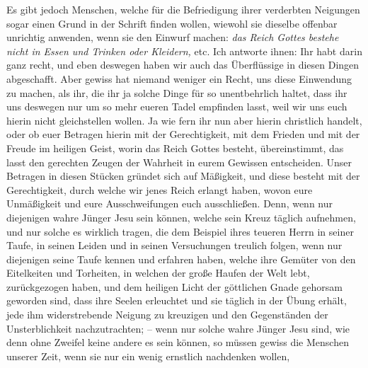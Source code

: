  Es gibt jedoch Menschen, welche für die
Befriedigung ihrer verderbten Neigungen
sogar einen Grund in der Schrift finden wollen, wiewohl sie dieselbe offenbar
unrichtig anwenden, wenn sie den Einwurf machen:
\textit{das Reich Gottes bestehe nicht
in Essen und Trinken oder Kleidern,} etc. Ich antworte ihnen: Ihr habt darin
ganz
recht, und eben deswegen haben wir auch das Überflüssige in diesen Dingen
abgeschafft. Aber gewiss hat niemand weniger ein Recht, uns diese Einwendung zu
machen, als ihr, die ihr ja solche Dinge für so unentbehrlich haltet, dass ihr
uns deswegen nur um so mehr eueren Tadel empfinden lasst, weil wir uns euch
hierin nicht gleichstellen wollen. Ja wie fern ihr nun aber hierin christlich
handelt, oder ob euer Betragen hierin mit der Gerechtigkeit, mit dem Frieden und
mit der Freude im heiligen Geist, worin das
Reich Gottes besteht,
übereinstimmt, das lasst den gerechten Zeugen der Wahrheit in
eurem Gewissen
entscheiden. Unser Betragen in diesen Stücken gründet sich auf Mäßigkeit, und
diese besteht mit der Gerechtigkeit, durch welche wir jenes Reich
erlangt
haben, wovon eure Unmäßigkeit und eure Ausschweifungen euch ausschließen. Denn,
wenn nur diejenigen wahre Jünger Jesu sein können, welche sein
Kreuz täglich
aufnehmen, und nur solche es wirklich tragen, die dem Beispiel ihres teueren
Herrn in seiner Taufe, in seinen Leiden und in seinen Versuchungen
treulich
folgen, wenn nur diejenigen seine Taufe kennen und erfahren haben, welche ihre
Gemüter von den Eitelkeiten und Torheiten, in welchen der große Haufen der Welt
lebt, zurückgezogen haben, und dem heiligen Licht der göttlichen
Gnade gehorsam
geworden sind, dass ihre Seelen erleuchtet und sie täglich in der Übung erhält,
jede ihm widerstrebende Neigung zu kreuzigen und den
Gegenständen der
Unsterblichkeit nachzutrachten;
-- wenn nur solche wahre Jünger
Jesu sind, wie denn ohne Zweifel keine andere es sein können, so müssen gewiss
die Menschen unserer Zeit, wenn sie nur ein wenig ernstlich nachdenken wollen,
